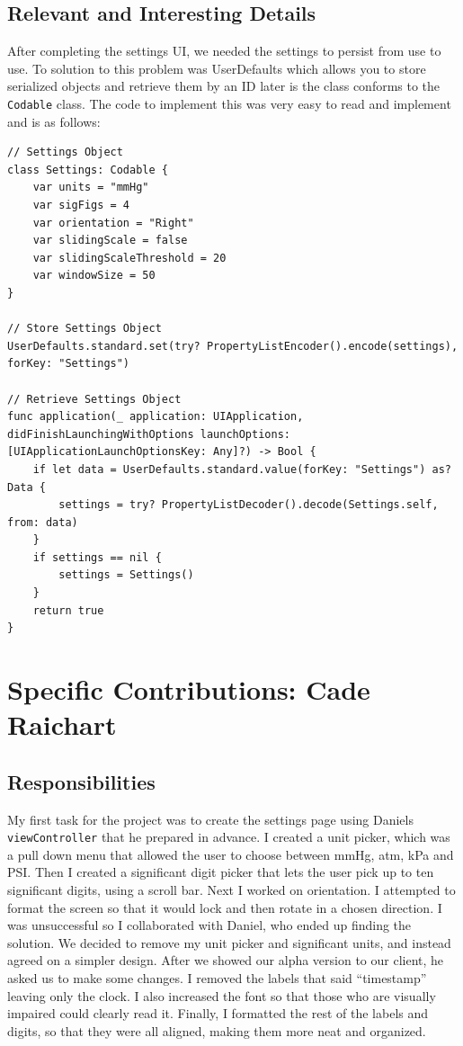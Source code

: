 \documentclass[onecolumn, draftclsnofoot,10pt, compsoc]{IEEEtran}
\begin{document}
    \subsection{Relevant and Interesting Details}
        After completing the settings UI, we needed the settings to persist from use to use.
        To solution to this problem was UserDefaults which allows you to store serialized objects and retrieve them by an ID later is the class conforms to the \texttt{Codable} class.
        The code to implement this was very easy to read and implement and is as follows:

\begin{lstlisting}
// Settings Object
class Settings: Codable {
    var units = "mmHg"
    var sigFigs = 4
    var orientation = "Right"
    var slidingScale = false
    var slidingScaleThreshold = 20
    var windowSize = 50
}

// Store Settings Object
UserDefaults.standard.set(try? PropertyListEncoder().encode(settings), forKey: "Settings")

// Retrieve Settings Object
func application(_ application: UIApplication, didFinishLaunchingWithOptions launchOptions: [UIApplicationLaunchOptionsKey: Any]?) -> Bool {
    if let data = UserDefaults.standard.value(forKey: "Settings") as? Data {
        settings = try? PropertyListDecoder().decode(Settings.self, from: data)
    }
    if settings == nil {
        settings = Settings()
    }
    return true
}

\end{lstlisting}


\section{Specific Contributions: Cade Raichart}
\subsection{Responsibilities}
My first task for the project was to create the settings page using Daniels \texttt{viewController} that he prepared in advance.
I created  a unit picker, which was a pull down menu that allowed the user to choose between mmHg, atm, kPa and PSI.
Then I created a significant digit picker that lets the user pick up to ten significant digits, using a scroll bar.
Next I worked on orientation.
I attempted to format the screen so that it would lock and then rotate in a chosen direction.
I was  unsuccessful so I collaborated with Daniel, who ended up finding the solution.
We decided to remove my unit picker and significant units, and instead agreed on a simpler design.
After we showed our alpha version to our client, he asked us to make some changes.
I removed the labels that said “timestamp” leaving only the clock.
I also increased the font so that those who are visually impaired could clearly read it.
Finally, I  formatted the rest of the labels and digits, so that they were all aligned, making them more neat and organized.
\end{document}
